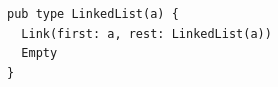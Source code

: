 \begin{lstlisting}
pub type LinkedList(a) {
  Link(first: a, rest: LinkedList(a))
  Empty
}
\end{lstlisting}